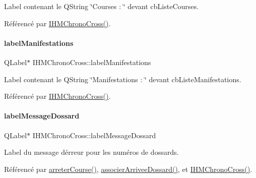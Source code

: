 Label contenant le Q\+String \char`\"{}\+Courses \+: \char`\"{} devant cb\+Liste\+Courses. 



Référencé par \hyperlink{class_i_h_m_chrono_cross_a479fc90733fba3e65fb06aa4a3adc02e}{I\+H\+M\+Chrono\+Cross()}.

\mbox{\label{class_i_h_m_chrono_cross_a7430cf36cc48d17297ddc03fe69e9b72}} 
\paragraph{\texorpdfstring{label\+Manifestations}{labelManifestations}}
{\footnotesize\ttfamily Q\+Label$\ast$ I\+H\+M\+Chrono\+Cross\+::label\+Manifestations\hspace{0.3cm}{\ttfamily [private]}}



Label contenant le Q\+String \char`\"{}\+Manifestations \+: \char`\"{} devant cb\+Liste\+Manifestations. 



Référencé par \hyperlink{class_i_h_m_chrono_cross_a479fc90733fba3e65fb06aa4a3adc02e}{I\+H\+M\+Chrono\+Cross()}.

\mbox{\label{class_i_h_m_chrono_cross_abd23647486d38e6f57aef1faf50757af}} 
\paragraph{\texorpdfstring{label\+Message\+Dossard}{labelMessageDossard}}
{\footnotesize\ttfamily Q\+Label$\ast$ I\+H\+M\+Chrono\+Cross\+::label\+Message\+Dossard\hspace{0.3cm}{\ttfamily [private]}}



Label du message d\textquotesingle{}érreur pour les numéros de dossards. 



Référencé par \hyperlink{class_i_h_m_chrono_cross_ad3d8f287d08dd9aa0c6b10c9973672a4}{arreter\+Course()}, \hyperlink{class_i_h_m_chrono_cross_a9f7f1ad130b60300a879694b6234f161}{associer\+Arrivee\+Dossard()}, et \hyperlink{class_i_h_m_chrono_cross_a479fc90733fba3e65fb06aa4a3adc02e}{I\+H\+M\+Chrono\+Cross()}.

